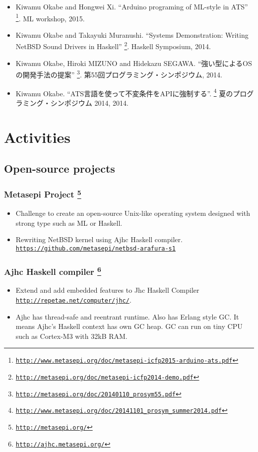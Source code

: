\documentclass[letterpaper]{article}
\begin{document}
\begin{itemize}
  \item Kiwamu Okabe and Hongwei Xi. ``Arduino programing of ML-style in ATS'' \footnote{\href{http://www.metasepi.org/doc/metasepi-icfp2015-arduino-ats.pdf}{\tt http://www.metasepi.org/doc/metasepi-icfp2015-arduino-ats.pdf}}. ML workshop, 2015.
  \item Kiwamu Okabe and Takayuki Muranushi. ``Systems Demonstration: Writing NetBSD Sound Drivers in Haskell'' \footnote{\href{http://metasepi.org/doc/metasepi-icfp2014-demo.pdf}{\tt http://metasepi.org/doc/metasepi-icfp2014-demo.pdf}}. Haskell Symposium, 2014.
  \item Kiwamu Okabe, Hiroki MIZUNO and Hidekazu SEGAWA. ``強い型によるOSの開発手法の提案'' \footnote{\href{http://metasepi.org/doc/20140110\_prosym55.pdf}{\tt http://metasepi.org/doc/20140110\_prosym55.pdf}}. 第55回プログラミング・シンポジウム, 2014.
  \item Kiwamu Okabe. ``ATS言語を使って不変条件をAPIに強制する''. \footnote{\href{http://www.metasepi.org/doc/20141101\_prosym\_summer2014.pdf}{\tt http://www.metasepi.org/doc/20141101\_prosym\_summer2014.pdf}} 夏のプログラミング・シンポジウム 2014, 2014.
\end{itemize}

\section*{Activities}

\subsection*{Open-source projects}

\subsubsection*{Metasepi Project \footnote{\href{http://metasepi.org/}{\tt http://metasepi.org/}}}
\begin{itemize}
\item Challenge to create an open-source Unix-like operating system designed with strong type such as ML or Haskell.
\item Rewriting NetBSD kernel using Ajhc Haskell compiler. \href{https://github.com/metasepi/netbsd-arafura-s1}{\tt https://github.com/metasepi/netbsd-arafura-s1}
\end{itemize}

\subsubsection*{Ajhc Haskell compiler \footnote{\href{http://ajhc.metasepi.org/}{\tt http://ajhc.metasepi.org/}}}
\begin{itemize}
\item Extend and add embedded features to Jhc Haskell Compiler \href{http://repetae.net/computer/jhc/}{\tt http://repetae.net/computer/jhc/}.
\item Ajhc has thread-safe and reentrant runtime. Also has Erlang style GC. It means Ajhc's Haskell context has own GC heap. GC can run on tiny CPU such as Cortex-M3 with 32kB RAM.
\end{itemize}
\end{document}

